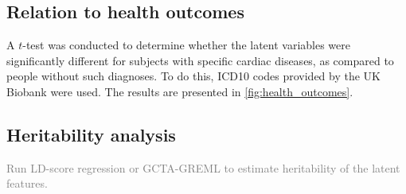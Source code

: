 \subsection*{Relation to health outcomes}
A $t$-test was conducted to determine whether the latent variables were significantly different for subjects with specific cardiac diseases, as compared to people without such diagnoses. To do this, ICD10 codes provided by the UK Biobank were used. The results are presented in \ref{fig:health_outcomes}.


\subsection*{Heritability analysis}
\textcolor{gray}{Run LD-score regression or GCTA-GREML to estimate heritability of the latent features.}

